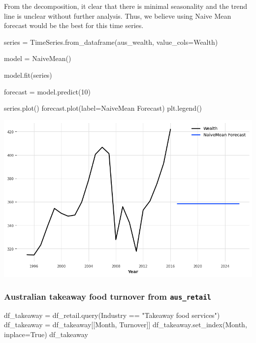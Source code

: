 \documentclass[
  11pt,
]{article}
\newenvironment{Shaded}{\begin{snugshade}}{\end{snugshade}}
\newcommand{\DecValTok}[1]{\textcolor[rgb]{0.68,0.00,0.00}{#1}}
\newcommand{\NormalTok}[1]{\textcolor[rgb]{0.00,0.23,0.31}{#1}}
\newcommand{\OperatorTok}[1]{\textcolor[rgb]{0.37,0.37,0.37}{#1}}
\newcommand{\StringTok}[1]{\textcolor[rgb]{0.13,0.47,0.30}{#1}}
\newcommand{\VariableTok}[1]{\textcolor[rgb]{0.07,0.07,0.07}{#1}}
\begin{document}
From the decomposition, it clear that there is minimal seasonality and
the trend line is unclear without further analysis. Thus, we believe
using Naive Mean forecast would be the best for this time series.

\begin{Shaded}
\begin{Highlighting}[]
\NormalTok{series }\OperatorTok{=}\NormalTok{ TimeSeries.from\_dataframe(aus\_wealth, value\_cols}\OperatorTok{=}\StringTok{\textquotesingle{}Wealth\textquotesingle{}}\NormalTok{)}

\NormalTok{model }\OperatorTok{=}\NormalTok{ NaiveMean()}

\NormalTok{model.fit(series)}

\NormalTok{forecast }\OperatorTok{=}\NormalTok{ model.predict(}\DecValTok{10}\NormalTok{)}

\NormalTok{series.plot()}
\NormalTok{forecast.plot(label}\OperatorTok{=}\StringTok{\textquotesingle{}NaiveMean Forecast\textquotesingle{}}\NormalTok{)}
\NormalTok{plt.legend()}
\end{Highlighting}
\end{Shaded}

\includegraphics{hw3_files/figure-pdf/cell-24-output-1.png}

\subsubsection{\texorpdfstring{Australian takeaway food turnover from
\texttt{aus\_retail}}{Australian takeaway food turnover from aus\_retail}}\label{australian-takeaway-food-turnover-from-aus_retail}

\begin{Shaded}
\begin{Highlighting}[]
\NormalTok{df\_takeaway }\OperatorTok{=}\NormalTok{ df\_retail.query(}\StringTok{\textquotesingle{}Industry == "Takeaway food services"\textquotesingle{}}\NormalTok{)}
\NormalTok{df\_takeaway }\OperatorTok{=}\NormalTok{ df\_takeaway[[}\StringTok{\textquotesingle{}Month\textquotesingle{}}\NormalTok{, }\StringTok{\textquotesingle{}Turnover\textquotesingle{}}\NormalTok{]]}
\NormalTok{df\_takeaway.set\_index(}\StringTok{\textquotesingle{}Month\textquotesingle{}}\NormalTok{, inplace}\OperatorTok{=}\VariableTok{True}\NormalTok{)}
\NormalTok{df\_takeaway}
\end{Highlighting}
\end{Shaded}
\end{document}

